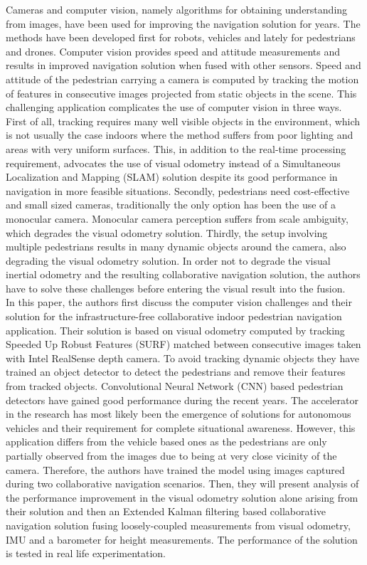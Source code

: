 Cameras and computer vision, namely algorithms for obtaining understanding from images, have been used for improving the navigation solution for years. The methods have been developed first for robots, vehicles and lately for
pedestrians and drones. Computer vision provides speed and attitude measurements and results in improved navigation solution when fused with other sensors. Speed
and attitude of the pedestrian carrying a camera is computed by tracking the motion of features in consecutive images projected from static objects in the scene. This challenging application complicates the use of computer vision in three ways. First of all, tracking requires many well visible objects in the
environment, which is not usually the case indoors where the method suffers from poor lighting and areas with very uniform surfaces. This, in addition to the real-time processing requirement, advocates the use of visual odometry instead of
a Simultaneous Localization and Mapping (SLAM) solution despite its good performance in navigation in more feasible situations. Secondly, pedestrians need cost-effective and small sized cameras, traditionally the only option has been the use of a monocular camera. Monocular camera perception suffers from scale ambiguity, which degrades the visual odometry solution. Thirdly, the setup involving multiple pedestrians results in many dynamic objects around the camera, also degrading the visual odometry solution. In order not to degrade
the visual inertial odometry and the resulting collaborative navigation solution, the authors have to solve these challenges before entering the visual result into the fusion.\\
In this paper, the authors first discuss the computer vision challenges and their solution for the infrastructure-free collaborative indoor pedestrian navigation application. Their solution is based on visual odometry computed by tracking Speeded Up Robust Features (SURF) matched between consecutive
images taken with Intel RealSense depth camera. To avoid tracking dynamic objects they have trained an object detector to detect the pedestrians and remove their features from tracked objects. Convolutional Neural Network (CNN) based pedestrian detectors have gained good performance during the recent years. The accelerator in the research has most likely been the emergence of solutions for autonomous vehicles and their requirement for complete situational awareness. However, this application differs from the vehicle based ones as the pedestrians are only partially observed from the images due to being at very close vicinity of the camera. Therefore, the authors have trained the model using images captured during two collaborative navigation scenarios. Then, they will present analysis of the performance improvement in the visual odometry solution alone arising from their solution and then an Extended Kalman filtering based collaborative navigation solution fusing loosely-coupled measurements from visual odometry, IMU and a barometer for height measurements. The
performance of the solution is tested in real life experimentation. \\
